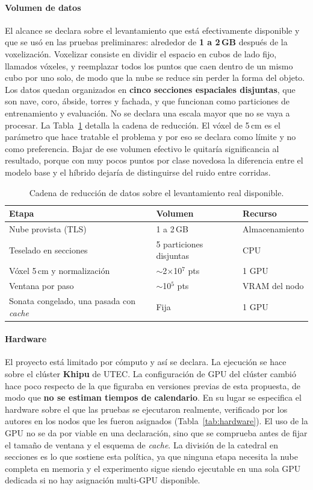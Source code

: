 \paragraph*{Volumen de datos}
El alcance se declara sobre el levantamiento que está efectivamente disponible y
que se usó en las pruebas preliminares: alrededor de \textbf{1 a 2\,GB} después
de la voxelización. Voxelizar consiste en dividir el espacio en cubos de lado
fijo, llamados vóxeles, y reemplazar todos los puntos que caen dentro de un mismo
cubo por uno solo, de modo que la nube se reduce sin perder la forma del objeto.
Los datos quedan organizados en \textbf{cinco secciones espaciales disjuntas},
que son nave, coro, ábside, torres y fachada, y que funcionan como particiones de
entrenamiento y evaluación. No se declara una escala mayor que no se vaya a
procesar. La Tabla~\ref{tab:datos} detalla la cadena de reducción. El vóxel de
5\,cm es el parámetro que hace tratable el problema y por eso se declara como
límite y no como preferencia. Bajar de ese volumen efectivo le quitaría
significancia al resultado, porque con muy pocos puntos por clase novedosa la
diferencia entre el modelo base y el híbrido dejaría de distinguirse del ruido
entre corridas.

\begin{table}[H]
\centering
\caption{Cadena de reducción de datos sobre el levantamiento real disponible.}
\label{tab:datos}
\begin{tabular}{@{}p{5.6cm}p{3.4cm}p{3.0cm}@{}}
\toprule
\textbf{Etapa} & \textbf{Volumen} & \textbf{Recurso} \\
\midrule
Nube provista (TLS) & 1 a 2\,GB & Almacenamiento \\
Teselado en secciones & 5 particiones disjuntas & CPU \\
Vóxel 5\,cm y normalización & $\sim$2$\times$10$^{7}$ pts & 1 GPU \\
Ventana por paso & $\sim$10$^{5}$ pts & VRAM del nodo \\
Sonata congelado, una pasada con \emph{cache} & Fija & 1 GPU \\
\bottomrule
\end{tabular}
\end{table}

\paragraph*{Hardware}
El proyecto está limitado por cómputo y así se declara. La ejecución se hace
sobre el clúster \textbf{Khipu} de UTEC. La configuración de GPU del clúster
cambió hace poco respecto de la que figuraba en versiones previas de esta
propuesta, de modo que \textbf{no se estiman tiempos de calendario}. En su lugar
se especifica el hardware sobre el que las pruebas se ejecutaron realmente,
verificado por los autores en los nodos que les fueron asignados
(Tabla~\ref{tab:hardware}). El uso de la GPU no se da por viable en una
declaración, sino que se comprueba antes de fijar el tamaño de ventana y el
esquema de \emph{cache}. La división de la catedral en secciones es lo que
sostiene esta política, ya que ninguna etapa necesita la nube completa en
memoria y el experimento sigue siendo ejecutable en una sola GPU dedicada si no
hay asignación multi-GPU disponible.

